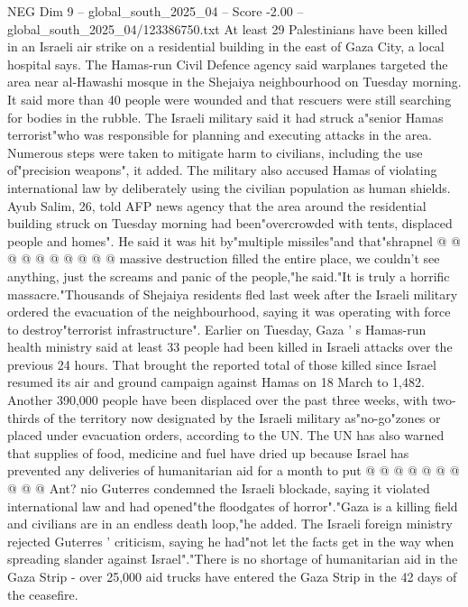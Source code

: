 \begin{textsample}{NEG Dim 9 – global\_south\_2025\_04 – Score -2.00 – global\_south\_2025\_04/123386750.txt}  \label{ex:f9_neg_269}
At least 29 Palestinians have been killed in an Israeli air strike on a residential building in the east of Gaza City, a local hospital says.
The Hamas-run Civil Defence agency said warplanes targeted the area near al-Hawashi mosque in the Shejaiya neighbourhood on Tuesday morning.
It said more than 40 people were wounded and that rescuers were still searching for bodies in the rubble.
The Israeli military said it had struck a"senior Hamas terrorist"who was responsible for planning and executing attacks in the area.
Numerous steps were taken to mitigate harm to civilians, including the use of"precision weapons", it added.
The military also accused Hamas of violating international law by deliberately using the civilian population as human shields.
Ayub Salim, 26, told AFP news agency that the area around the residential building struck on Tuesday morning had been"overcrowded with tents, displaced people and homes".
He said it was hit by"multiple missiles"and that"shrapnel @ @ @ @ @ @ @ @ @ @ massive destruction filled the entire place, we couldn't see anything, just the screams and panic of the people,"he said."It is truly a horrific massacre."Thousands of Shejaiya residents fled last week after the Israeli military ordered the evacuation of the neighbourhood, saying it was operating with force to destroy"terrorist infrastructure".
Earlier on Tuesday, Gaza ' s Hamas-run health ministry said at least 33 people had been killed in Israeli attacks over the previous 24 hours.
That brought the reported total of those killed since Israel resumed its air and ground campaign against Hamas on 18 March to 1,482.
Another 390,000 people have been displaced over the past three weeks, with two-thirds of the territory now designated by the Israeli military as"no-go"zones or placed under evacuation orders, according to the UN.
The UN has also warned that supplies of food, medicine and fuel have dried up because Israel has prevented any deliveries of humanitarian aid for a month to put @ @ @ @ @ @ @ @ @ @ Ant? nio Guterres condemned the Israeli blockade, saying it violated international law and had opened"the floodgates of horror"."Gaza is a killing field and civilians are in an endless death loop,"he added.
The Israeli foreign ministry rejected Guterres ' criticism, saying he had"not let the facts get in the way when spreading slander against Israel"."There is no shortage of humanitarian aid in the Gaza Strip - over 25,000 aid trucks have entered the Gaza Strip in the 42 days of the ceasefire.

\end{textsample}
